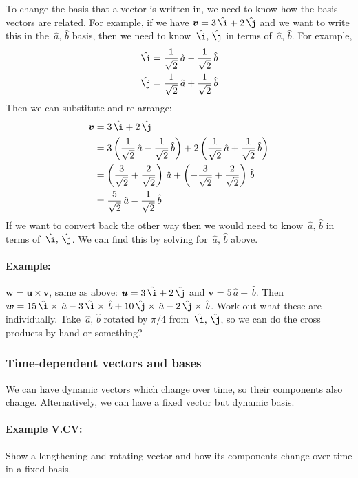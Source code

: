 \documentclass{article}
\renewcommand{\vec}[1]{\boldsymbol{#1}}
\newcommand{\unit}[1]{\,\hat{#1}}
\begin{document}
To change the basis that a vector is written in, we need to know how
the basis vectors are related. For example, if we have $\vec{v} =
3\unit{\i} + 2\unit{\j}$ and we want to write this in the $\unit{a}, \unit{b}$
basis, then we need to know $\unit{\i}, \unit{\j}$ in terms of $\unit{a}, \unit{b}$. For example,
\begin{align}
  \unit{\i} &= \frac{1}{\sqrt{2}} \unit{a} - \frac{1}{\sqrt{2}} \unit{b} \\
  \unit{\j} &= \frac{1}{\sqrt{2}} \unit{a} + \frac{1}{\sqrt{2}} \unit{b}
\end{align}
Then we can substitute and re-arrange:
\begin{align}
  \vec{v} &= 3\unit{\i} + 2\unit{\j} \\
  &= 3\left(\frac{1}{\sqrt{2}} \unit{a} - \frac{1}{\sqrt{2}} \unit{b}\right)
  + 2\left(\frac{1}{\sqrt{2}} \unit{a} + \frac{1}{\sqrt{2}} \unit{b}\right) \\
  &= \left(\frac{3}{\sqrt{2}} + \frac{2}{\sqrt{2}} \right) \unit{a}
  + \left(-\frac{3}{\sqrt{2}} + \frac{2}{\sqrt{2}} \right) \unit{b} \\
  &= \frac{5}{\sqrt{2}} \unit{a} - \frac{1}{\sqrt{2}} \unit{b}
\end{align}
If we want to convert back the other way then we would need to know
$\unit{a}, \unit{b}$ in terms of $\unit{\i}, \unit{\j}$. We can find this by
solving for $\unit{a}, \unit{b}$ above.

\paragraph{Example:} $\vec{w} = \vec{u} \times \vec{v}$, same as
above: $\vec{u} = 3\unit{\i} + 2\unit{\j}$ and $\vec{v} = 5\unit{a} -
\unit{b}$. Then $\vec{w} = 15 \unit{\i} \times \unit{a} - 3 \unit{\i}
\times \unit{b} + 10 \unit{\j} \times \unit{a} - 2 \unit{\j} \times
\unit{b}$. Work out what these are individually. Take $\unit{a},
\unit{b}$ rotated by $\pi/4$ from $\unit{\i}, \unit{\j}$, so we can do
the cross products by hand or something?

\subsubsection{Time-dependent vectors and bases}

We can have dynamic vectors which change over time, so their
components also change. Alternatively, we can have a fixed vector but
dynamic basis.

\paragraph{Example V.CV:} Show a lengthening and rotating vector and
how its components change over time in a fixed basis.
\end{document}
